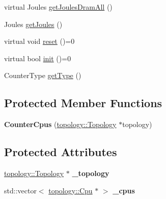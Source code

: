 \begin{DoxyCompactItemize}
\item 
virtual Joules \hyperlink{classmammut_1_1energy_1_1CounterCpus_ab818873ea2311617efdb5385da0da8ee}{get\-Joules\-Dram\-All} ()
\item 
Joules \hyperlink{classmammut_1_1energy_1_1CounterCpus_a6f6471724522433e88f07d60456671e5}{get\-Joules} ()
\item 
virtual void \hyperlink{classmammut_1_1energy_1_1CounterCpus_ac3d2b3c06119c5e4f077b05689b2374a}{reset} ()=0
\item 
virtual bool \hyperlink{classmammut_1_1energy_1_1CounterCpus_af4496166c7b79cd60fe57baa4b6e72a1}{init} ()=0
\item 
Counter\-Type \hyperlink{classmammut_1_1energy_1_1CounterCpus_ad84d1173e2629965b2e2bcc823e028b7}{get\-Type} ()
\end{DoxyCompactItemize}
\subsection*{Protected Member Functions}
\begin{DoxyCompactItemize}
\item 
\hypertarget{classmammut_1_1energy_1_1CounterCpus_a0a27e24202f786849a1dc5b2aaec97f9}{{\bfseries Counter\-Cpus} (\hyperlink{classmammut_1_1topology_1_1Topology}{topology\-::\-Topology} $\ast$topology)}\label{classmammut_1_1energy_1_1CounterCpus_a0a27e24202f786849a1dc5b2aaec97f9}

\end{DoxyCompactItemize}
\subsection*{Protected Attributes}
\begin{DoxyCompactItemize}
\item 
\hypertarget{classmammut_1_1energy_1_1CounterCpus_a8bf39ebc967a0b2ba256e34eeb7694e6}{\hyperlink{classmammut_1_1topology_1_1Topology}{topology\-::\-Topology} $\ast$ {\bfseries \-\_\-topology}}\label{classmammut_1_1energy_1_1CounterCpus_a8bf39ebc967a0b2ba256e34eeb7694e6}

\item 
\hypertarget{classmammut_1_1energy_1_1CounterCpus_a8af8ffffde962f5087f7aa23b3794c53}{std\-::vector$<$ \hyperlink{classmammut_1_1topology_1_1Cpu}{topology\-::\-Cpu} $\ast$ $>$ {\bfseries \-\_\-cpus}}\label{classmammut_1_1energy_1_1CounterCpus_a8af8ffffde962f5087f7aa23b3794c53}

\end{DoxyCompactItemize}


